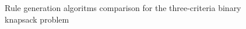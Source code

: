 \begin{figure}
  \centering
  \caption{Rule generation algoritms comparison for the three-criteria binary knapsack problem}
  \label{c3_algo}
\end{figure}

